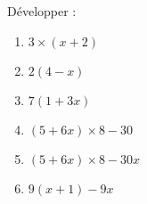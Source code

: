 
\begin{exercice}\label{exosmath-0980}

    Développer :
    \begin{multicols}{2}
        \begin{enumerate}
            \item
                \( 3\times (x+2)\)
            \item
                \( 2(4-x)\)
            \item
                \( 7(1+3x)\)
            \item
                \( (5+6x)\times 8-30\)
            \item
                \( (5+6x)\times 8-30x\)
            \item
                \( 9(x+1)-9x\)
        \end{enumerate}
    \end{multicols}

\end{exercice}
